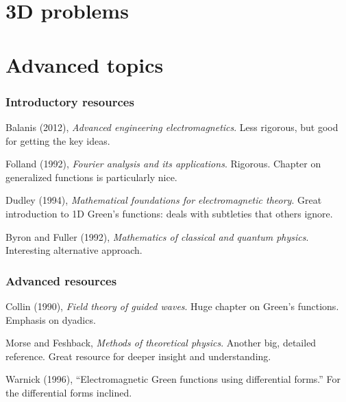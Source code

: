 \documentclass[12 pt, compress, handout, intlimits]{beamer}
\begin{document}

\section{3D problems}
\label{sec:3d_problems}

\note{}

\section{Advanced topics}
\label{sec:advanced_topics}

\note{}


\begin{frame}[fragile]
    \frametitle{Introductory resources}
    Balanis (2012), \emph{Advanced engineering electromagnetics}. 
    Less rigorous, but good for getting the key ideas.

    Folland (1992), \emph{Fourier analysis and its applications}. 
    Rigorous. Chapter on generalized functions is particularly nice.

    Dudley (1994), \emph{Mathematical foundations for electromagnetic theory}.
    Great introduction to 1D Green's functions: deals with subtleties that others ignore.

    Byron and Fuller (1992), \emph{Mathematics of classical and quantum physics}.
    Interesting alternative approach.
    
\end{frame}

\note{}

\begin{frame}[fragile]
    \frametitle{Advanced resources}
    Collin (1990), \emph{Field theory of guided waves}. 
    Huge chapter on Green's functions. Emphasis on dyadics.

    Morse and Feshback, \emph{Methods of theoretical physics}.
    Another big, detailed reference. Great resource for deeper insight and understanding.

    Warnick (1996), ``Electromagnetic Green functions using differential forms.''
    For the differential forms inclined.

\end{frame}    

\note{}
\end{document}

